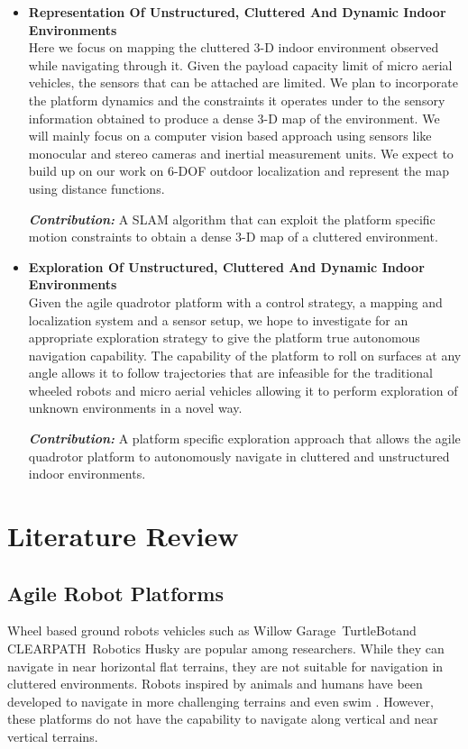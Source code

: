 \documentclass[12pt,a4paper]{report}
\begin{document}
\begin{itemize}
	\item\textbf{Representation Of Unstructured, Cluttered And Dynamic Indoor Environments}
    \\Here we focus on mapping the cluttered 3-D indoor environment observed while navigating through it.  Given the payload capacity limit of micro aerial vehicles, the sensors that can be attached are limited. We plan to incorporate the platform dynamics and the constraints it operates under to the sensory information obtained to produce a dense 3-D map of the environment. We will mainly focus on a computer vision based approach using sensors like monocular and stereo cameras and inertial measurement units. We expect to build up on our work on 6-DOF outdoor localization and represent the map using distance functions. \par
    \textbf{\emph{Contribution:}}
    A SLAM algorithm that can exploit the platform specific motion constraints to obtain a dense 3-D map of a cluttered environment.
    
    \item\textbf{Exploration Of Unstructured, Cluttered And Dynamic Indoor Environments}
    \\Given the agile quadrotor platform with a control strategy, a mapping and localization system and a sensor setup, we hope to investigate for an appropriate exploration strategy to give the platform true autonomous navigation capability. The capability of the platform to roll on surfaces at any angle allows it to follow trajectories that are infeasible for the traditional wheeled robots and micro aerial vehicles allowing it to perform exploration of unknown environments in a novel way. \par 
    \textbf{\emph{Contribution:}}
    A platform specific exploration approach that allows the agile quadrotor platform to autonomously navigate in cluttered and unstructured indoor environments. 
    
\end{itemize}

\chapter{Literature Review}

\section{Agile Robot Platforms}
\label{litWallClimbingRobots}
Wheel based ground robots vehicles such as Willow Garage\textregistered\ TurtleBot\texttrademark and CLEARPATH\texttrademark\ Robotics Husky are popular among researchers. While they can navigate in near horizontal flat terrains, they are not suitable for navigation in cluttered environments. Robots inspired by animals \cite{Lewinger2009}\cite{Parasuraman2010} and humans \cite{Kaneko2008} \cite{ROB:ROB21697} have been developed to navigate in more challenging terrains and even swim \cite{Nakashima2016}. However, these platforms do not have the capability to navigate along vertical and near vertical terrains.
\end{document}

